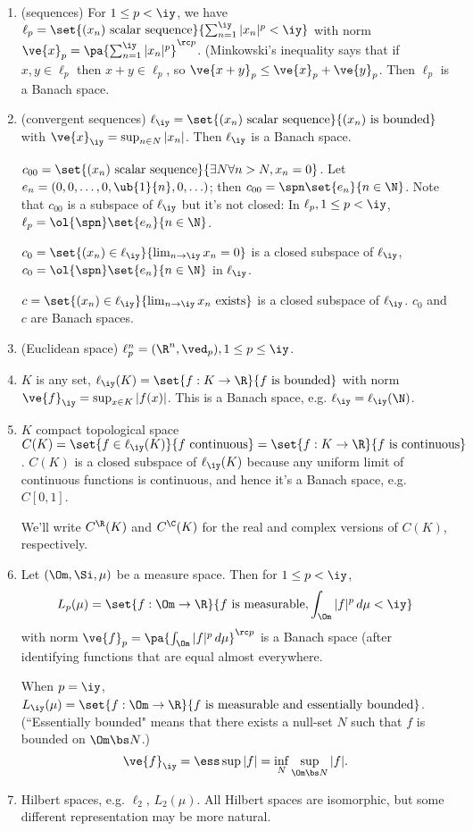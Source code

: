 \begin{ex}
\begin{enumerate}
\item (sequences)
For $1\le p<\iy$, we have $\ell_p=\set{(x_n)\text{ scalar sequence}}{\sum_{n=1}^{\iy}|x_n|^p<\iy}$ with norm $\ve{x}_p=\pa{\sum_{n=1}^{\iy}|x_n|^p}^{\rc p}$. (Minkowski's inequality says that if $x,y\in \ell_p$ then $x+y\in \ell_p$, so $\ve{x+y}_p\le \ve{x}_p+\ve{y}_p$. Then $\ell_p$ is a Banach space.
\item (convergent sequences)
$\ell_{\iy}=\set{(x_n)\text{ scalar sequence}}{(x_n)\text{ is bounded}}$ with $\ve{x}_{\iy}=\sup_{n\in N}|x_n|$. Then $\ell_{\iy}$ is a Banach space.

$c_{00}=\set{(x_n)\text{ scalar sequence}}{\exists N\forall n>N, x_n=0}$. Let $e_n=(0,0,\ldots, 0,\ub{1}{n},0,\ldots)$; then $c_{00}=\spn\set{e_n}{n\in \N}$. Note that $c_{00}$ is a subspace of $\ell_{\iy}$ but it's not closed: In $\ell_p, 1\le p<\iy$, $\ell_p=\ol{\spn}\set{e_n}{n\in \N}$. 

$c_0=\set{(x_n)\in \ell_{\iy}}{\lim_{n\to \iy} x_n=0}$ is a closed subspace of $\ell_{\iy}$, $c_0=\ol{\spn}\set{e_n}{n\in \N}$ in $\ell_{\iy}$.

$c=\set{(x_n)\in \ell_{\iy}}{\lim_{n\to \iy} x_n \text{ exists}}$ is a closed subspace of $\ell_{\iy}$. $c_0$ and $c$ are Banach spaces.
\item (Euclidean space)
$\ell_p^n=(\R^n,\ved_p), 1\le p\le \iy$.
\item 
$K$ is any set, $\ell_{\iy}(K)=\set{f:K\to \R}{f\text{ is bounded}}$ with norm $\ve{f}_{\iy}=\sup_{x\in K}|f(x)|$. This is a Banach space, e.g. $\ell_{\iy}=\ell_\iy(\N)$.
\item 
$K$ compact topological space $C(K)=\set{f\in \ell_{\iy}(K)}{f\text{ continuous}}=\set{f:K\to \R}{f\text{ is continuous}}$. $C(K)$ is a closed subspace of $\ell_{\iy}(K)$ because any uniform limit of continuous functions is continuous, and hence it's a Banach space, e.g. $C[0,1]$.

We'll write $C^{\R}(K)$ and $C^{\C}(K)$ for the real and complex versions of $C(K)$, respectively.
\item 
Let $(\Om,\Si,\mu)$ be a measure space. Then for $1\le p<\iy$,  \[L_p(\mu)=\set{f:\Om\to \R}{f\text{ is measurable}, \int_{\Om}|f|^p\,d\mu<\iy}\] with norm $\ve{f}_p=\pa{\int_{\Om}|f|^p\,d\mu}^{\rc p}$ is a Banach space (after identifying functions that are equal almost everywhere. 

When $p=\iy$, $L_{\iy}(\mu)=\set{f:\Om\to \R}{f\text{ is measurable and essentially bounded}}$. (``Essentially bounded" means that there exists a null-set $N$ such that $f$ is bounded on $\Om\bs N$.)
\[
\ve{f}_{\iy}=\ess\sup|f|=\inf_N\sup_{\Om\bs N}|f|.
\]
\item
Hilbert spaces, e.g. $\ell_2$, $L_2(\mu)$. All Hilbert spaces are isomorphic, but some different representation may be more natural.
\end{enumerate}
\end{ex}

